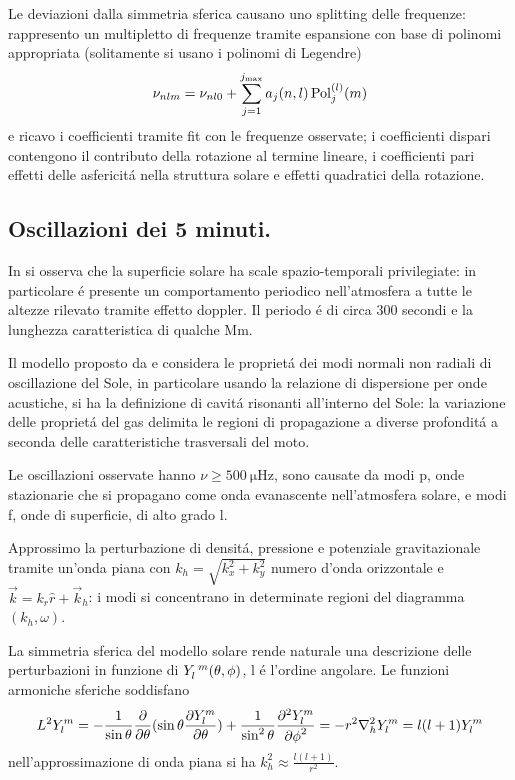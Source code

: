 \documentclass[../main.tex]{subfiles}
\begin{document}
Le deviazioni dalla simmetria sferica causano uno splitting delle frequenze: rappresento un multipletto di frequenze tramite espansione con base di polinomi appropriata (solitamente si usano i polinomi di Legendre)
\begin{equation}
\nu_{nlm}=\nu_{nl0}+\sum_{j=1}^{j_{\max}}a_j(n,l)\operatorname{Pol}_j^{(l)}(m)\label{eq:freqmulti}
\end{equation}
e ricavo i coefficienti tramite fit con le frequenze osservate; i coefficienti dispari contengono il contributo della rotazione al termine lineare, i coefficienti pari effetti delle asfericit\'a nella struttura solare e effetti quadratici della rotazione.

\subsection{Oscillazioni dei 5 minuti.}

In \citet{lei62velocity} si osserva che la superficie solare ha scale spazio-temporali privilegiate: in particolare \'e presente un comportamento periodico nell'atmosfera a tutte le altezze rilevato tramite effetto doppler. Il periodo \'e di circa 300 secondi e la lunghezza caratteristica di qualche \si{\mega\meter}.

Il modello proposto da \citet{ulrich70five} e \citet*{stein71five} considera le propriet\'a dei modi normali non radiali di oscillazione del Sole, in particolare usando la relazione di dispersione per onde acustiche, si ha la definizione di cavit\'a risonanti all'interno del Sole: la variazione delle propriet\'a del gas delimita le regioni di propagazione a diverse profondit\'a a seconda delle caratteristiche trasversali del moto.

Le oscillazioni osservate hanno $\nu\geq\SI{500}{\micro\hertz}$, sono causate da modi p, onde stazionarie che si propagano come onda evanascente nell'atmosfera solare, e modi f, onde di superficie, di alto grado l.

Approssimo la perturbazione di densit\'a, pressione e potenziale gravitazionale tramite un'onda piana con $k_h=\sqrt{k_x^2+k_y^2}$ numero d'onda orizzontale e $\vec{k}=k_r\hat{r}+\vec{k}_h$:  i modi si concentrano in determinate regioni del diagramma  $(k_h,\omega)$.

La simmetria sferica del modello solare rende naturale una descrizione delle perturbazioni in funzione di $Y\indices{_l^m}(\theta,\phi)$, l \'e l'ordine angolare. Le funzioni armoniche sferiche  soddisfano
\begin{equation}
L^2Y_l^m=-\frac{1}{\sin{\theta}}\frac{\partial}{\partial \theta}(\sin{\theta}\frac{\partial Y_l^m}{\partial \theta})+\frac{1}{\sin^2{\theta}}\frac{\partial^2 Y_l^m}{{\partial \phi}^2}=-r^2\nabla_h^2Y_l^m=l(l+1)Y_l^m\label{eq:SHperturb}
\end{equation}
nell'approssimazione di onda piana si ha $k_h^2\approx\frac{l(l+1)}{r^2}$.
\end{document}
